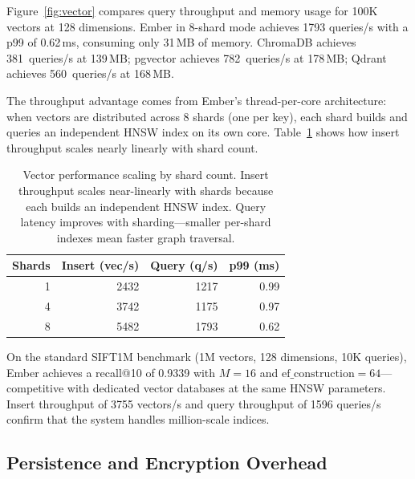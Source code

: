 \documentclass[conference]{IEEEtran}
\begin{document}
Figure~\ref{fig:vector} compares query throughput and memory usage
for 100K vectors at 128 dimensions. Ember in 8-shard mode achieves
\num{1793} queries/s with a p99 of 0.62\,ms, consuming only 31\,MB
of memory. ChromaDB achieves 381~queries/s at 139\,MB; pgvector
achieves 782~queries/s at 178\,MB; Qdrant achieves 560~queries/s at
168\,MB.

The throughput advantage comes from Ember's thread-per-core
architecture: when vectors are distributed across 8 shards (one per
key), each shard builds and queries an independent HNSW index on its
own core. Table~\ref{tab:vector-detail} shows how insert throughput
scales nearly linearly with shard count.

\begin{table}[t]
\centering
\caption{Vector performance scaling by shard count. Insert throughput
scales near-linearly with shards because each builds an independent
HNSW index. Query latency improves with sharding---smaller per-shard
indexes mean faster graph traversal.}
\label{tab:vector-detail}
\small
\begin{tabular}{@{}rrrr@{}}
\toprule
\textbf{Shards} & \textbf{Insert (vec/s)} & \textbf{Query (q/s)} & \textbf{p99 (ms)} \\
\midrule
1 & \num{2432} & \num{1217} & 0.99 \\
4 & \num{3742} & \num{1175} & 0.97 \\
8 & \num{5482} & \num{1793} & 0.62 \\
\bottomrule
\end{tabular}
\end{table}

On the standard SIFT1M benchmark (1M vectors, 128 dimensions, 10K
queries), Ember achieves a recall@10 of 0.9339 with $M{=}16$ and
$\text{ef\_construction}{=}64$---competitive with dedicated vector
databases at the same HNSW parameters. Insert throughput of
\num{3755} vectors/s and query throughput of \num{1596} queries/s
confirm that the system handles million-scale indices.


\subsection{Persistence and Encryption Overhead}
\end{document}

